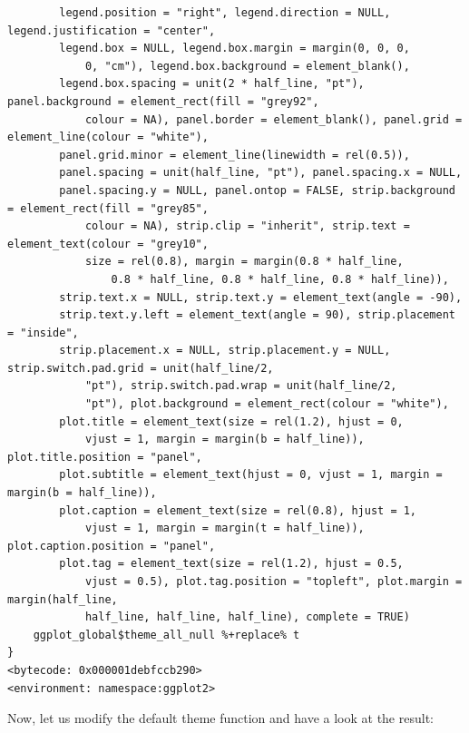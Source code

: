 \documentclass[
  letterpaper,
  DIV=11,
  numbers=noendperiod]{scrreprt}
\begin{document}
\begin{verbatim}
        legend.position = "right", legend.direction = NULL, legend.justification = "center", 
        legend.box = NULL, legend.box.margin = margin(0, 0, 0, 
            0, "cm"), legend.box.background = element_blank(), 
        legend.box.spacing = unit(2 * half_line, "pt"), panel.background = element_rect(fill = "grey92", 
            colour = NA), panel.border = element_blank(), panel.grid = element_line(colour = "white"), 
        panel.grid.minor = element_line(linewidth = rel(0.5)), 
        panel.spacing = unit(half_line, "pt"), panel.spacing.x = NULL, 
        panel.spacing.y = NULL, panel.ontop = FALSE, strip.background = element_rect(fill = "grey85", 
            colour = NA), strip.clip = "inherit", strip.text = element_text(colour = "grey10", 
            size = rel(0.8), margin = margin(0.8 * half_line, 
                0.8 * half_line, 0.8 * half_line, 0.8 * half_line)), 
        strip.text.x = NULL, strip.text.y = element_text(angle = -90), 
        strip.text.y.left = element_text(angle = 90), strip.placement = "inside", 
        strip.placement.x = NULL, strip.placement.y = NULL, strip.switch.pad.grid = unit(half_line/2, 
            "pt"), strip.switch.pad.wrap = unit(half_line/2, 
            "pt"), plot.background = element_rect(colour = "white"), 
        plot.title = element_text(size = rel(1.2), hjust = 0, 
            vjust = 1, margin = margin(b = half_line)), plot.title.position = "panel", 
        plot.subtitle = element_text(hjust = 0, vjust = 1, margin = margin(b = half_line)), 
        plot.caption = element_text(size = rel(0.8), hjust = 1, 
            vjust = 1, margin = margin(t = half_line)), plot.caption.position = "panel", 
        plot.tag = element_text(size = rel(1.2), hjust = 0.5, 
            vjust = 0.5), plot.tag.position = "topleft", plot.margin = margin(half_line, 
            half_line, half_line, half_line), complete = TRUE)
    ggplot_global$theme_all_null %+replace% t
}
<bytecode: 0x000001debfccb290>
<environment: namespace:ggplot2>
\end{verbatim}

Now, let us modify the default theme function and have a look at the
result:
\end{document}
